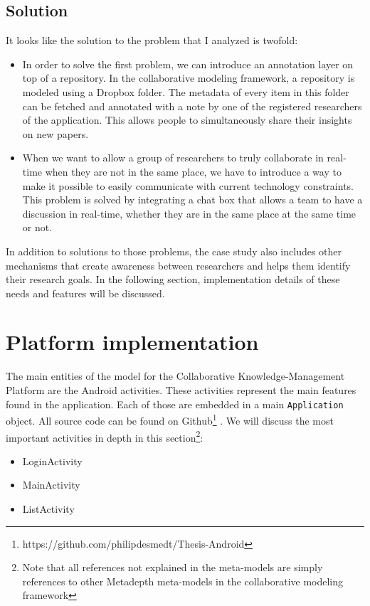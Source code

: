 \subsection{Solution}

It looks like the solution to the problem that I analyzed is twofold:
\begin{itemize}
\item{In order to solve the first problem, we can introduce an annotation layer on top of a repository. In the collaborative modeling framework, a repository is modeled using a Dropbox folder. The metadata of every item in this folder can be fetched and annotated with a note by one of the registered researchers of the application. This allows people to simultaneously share their insights on new papers.} 
\item{When we want to allow a group of researchers to truly collaborate in real-time when they are not in the same place, we have to introduce a way to make it possible to easily communicate with current technology constraints. This problem is solved by integrating a chat box that allows a team to have a discussion in real-time, whether they are in the same place at the same time or not.}
\end{itemize}
In addition to solutions to those problems, the case study also includes other mechanisms that create awareness between researchers and helps them identify their research goals. In the following section, implementation details of these needs and features will be discussed.

\section{Platform implementation}

The main entities of the model for the Collaborative Knowledge-Management Platform are the Android activities. These activities represent the main features found in the application. Each of those are embedded in a main \texttt{Application} object. All source code can be found on Github\footnote{https://github.com/philipdesmedt/Thesis-Android} \cite{Github}. We will discuss the most important activities in depth in this section\footnote{Note that all references not explained in the meta-models are simply references to other Metadepth meta-models in the collaborative modeling framework}:
\begin{itemize}
\item{LoginActivity}
\item{MainActivity}
\item{ListActivity}
\end{itemize} 

